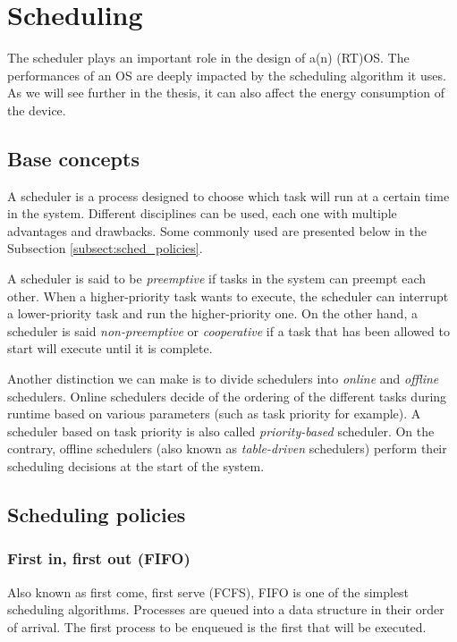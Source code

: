 \section{Scheduling}

The scheduler plays an important role in the design of a(n) (RT)OS.
The performances of an OS are deeply impacted by the scheduling algorithm it uses.
As we will see further in the thesis, it can also affect the energy consumption of the device.\\

\subsection{Base concepts}

A scheduler is a process designed to choose which task will run at a certain time in the system.
Different disciplines can be used, each one with multiple advantages and drawbacks.
Some commonly used are presented below in the Subsection \ref{subsect:sched_policies}.

A scheduler is said to be \textit{preemptive} if tasks in the system can preempt each other.
When a higher-priority task wants to execute, the scheduler can interrupt a lower-priority task and run the higher-priority one.
On the other hand, a scheduler is said \textit{non-preemptive} or \textit{cooperative}
    if a task that has been allowed to start will execute until it is complete.

Another distinction we can make is to divide schedulers into \textit{online} and \textit{offline} schedulers.
Online schedulers decide of the ordering of the different tasks during runtime based on various parameters (such as task priority for example).
A scheduler based on task priority is also called \textit{priority-based} scheduler.
On the contrary, offline schedulers (also known as \textit{table-driven} schedulers) perform their scheduling decisions at the start of the system.

\subsection{Scheduling policies\label{subsect:sched_policies}}

\subsubsection{First in, first out (FIFO)}
Also known as first come, first serve (FCFS), FIFO is one of the simplest scheduling algorithms.
Processes are queued into a data structure in their order of arrival.
The first process to be enqueued is the first that will be executed.


